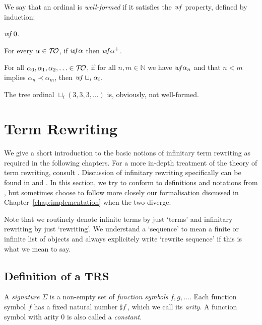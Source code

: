 \begin{definition}%
  We say that an ordinal is \emph{well-formed} if it satisfies the
  $\mathit{wf}$ property, defined by induction:
\begin{compactenum}
  \item
    $\mathit{wf} \, 0$.
  \item
    For every $\alpha \in \mathcal{T\!O}$, if $\mathit{wf} \alpha$ then
    $\mathit{wf} \alpha^+$.
  \item
    For all $\alpha_0, \alpha_1, \alpha_2, \ldots \in \mathcal{T\!O}$, if for
    all $n,m \in \mathbb{N}$ we have $\mathit{wf} \alpha_n$ and that
    $n < m$ implies $\alpha_n \prec \alpha_m$, then $\mathit{wf}
    \sqcup_i \alpha_i$.
\end{compactenum}
\end{definition}

The tree ordinal $\sqcup_i (3, 3, 3, \ldots)$ is, obviously, not
well-formed.


\section{Term Rewriting}\label{sec:rewriting}

We give a short introduction to the basic notions of infinitary term
rewriting as required in the following chapters. For a more in-depth
treatment of the theory of term rewriting, consult
\citet{terese-03}. Discussion of infinitary rewriting specifically
can be found in \citet[Chapter 12]{terese-03} and
\citet{klop-de-vrijer-05}. In this section, we try to conform to
definitions and notations from \citet{terese-03}, but sometimes choose
to follow more closely our \Coq formalisation discussed in
Chapter~\ref{chap:implementation} when the two diverge.

Note that we routinely denote infinite terms by just `terms' and infinitary
rewriting by just `rewriting'. We understand a `sequence' to mean a finite or
infinite list of objects and always explicitely write `rewrite
sequence' if this is what we mean to say.


\subsection{Definition of a TRS}\label{sub:trs}

\begin{definition}%
A \emph{signature} $\Sigma$ is a non-empty set of \emph{function symbols} $f,
g, \ldots$. Each function symbol $f$ has a fixed natural number
$\sharp f$, which we call its \emph{arity}. A function symbol with
arity $0$ is also called a \emph{constant}.
\end{definition}

